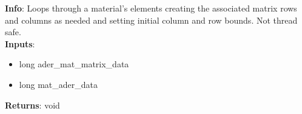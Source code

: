 \textbf{Info}: Loops through a material's elements creating the associated
matrix rows and columns as needed and setting initial column and row bounds.
Not thread safe. \\

\noindent \textbf{Inputs}:
\begin{itemize}
\item{long ader\_mat\_matrix\_data}
\item{long mat\_ader\_data}
\end{itemize}

\noindent \textbf{Returns}: void

